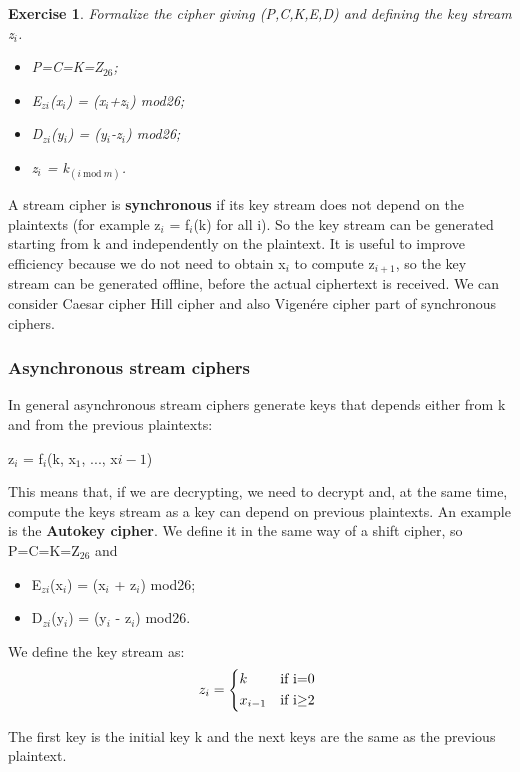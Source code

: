 \documentclass[a4paper, 12pt]{report}
\newtheorem{exercise}{\textbf{Exercise}}
\begin{document}
\begin{exercise}
	Formalize the cipher giving (P,C,K,E,D) and defining the key stream z$_i$.
	\begin{itemize}
		\item P=C=K=Z$_{26}$;
		\item E$_{zi}$(x$_i$) = (x$_i$+z$_i$) mod26;
		\item D$_{zi}$(y$_i$) = (y$_i$-z$_i$) mod26;
		\item z$_i$ = k$_{(i \ \text{mod} \ m)}$.
	\end{itemize}
\end{exercise}

A stream cipher is \textbf{synchronous} if its key stream does not depend on the plaintexts (for example z$_i$ = f$_i$(k) for all i). So the key stream can be generated starting from k and independently on the plaintext. It is useful to improve efficiency because we do not need to obtain x$_i$ to compute z$_{i+1}$, so the key stream can be generated offline, before the actual ciphertext is received. We can consider Caesar cipher Hill cipher and also Vigenére cipher part of synchronous ciphers.

\subsubsection{Asynchronous stream ciphers}
In general asynchronous stream ciphers generate keys that depends either from k and from the previous plaintexts:
\begin{center}
	z$_i$ = f$_i$(k, x$_1$, ..., x${i-1}$)
\end{center}
This means that, if we are decrypting, we need to decrypt and, at the same time, compute the keys stream as a key can depend on previous plaintexts. An example is the \textbf{Autokey cipher}. We define it in the same way of a shift cipher, so P=C=K=Z$_{26}$ and
\begin{itemize}
	\item E$_{zi}$(x$_i$) = (x$_i$ + z$_i$) mod26;
	\item D$_{zi}$(y$_i$) = (y$_i$ - z$_i$) mod26.
\end{itemize}
We define the key stream as:
\[ z_i = \begin{cases*}
k & if  i=0  \\
x_{i-1} & if i$\ge$2
\end{cases*} \]%

The first key is the initial key k and the next keys are the same as the previous plaintext.
\end{document}
